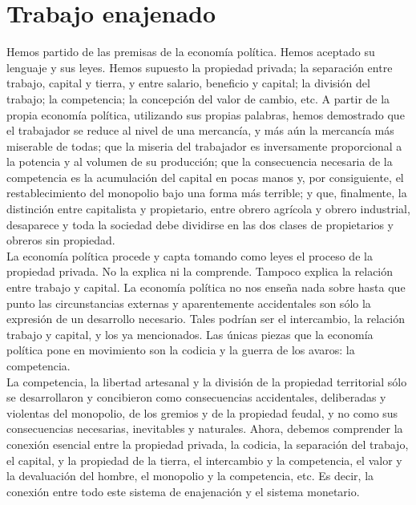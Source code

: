 \section{Trabajo enajenado}
Hemos partido de las premisas de la economía política. Hemos aceptado su lenguaje y sus leyes. Hemos supuesto la propiedad privada; la separación entre trabajo, capital y tierra, y entre salario, beneficio y capital; la división del trabajo; la competencia; la concepción del valor de cambio, etc. A partir de la propia economía política, utilizando sus propias palabras, hemos demostrado que el trabajador se reduce al nivel de una mercancía, y más aún la mercancía más miserable de todas; que la miseria del trabajador es inversamente proporcional a la potencia y al volumen de su producción; que la consecuencia necesaria de la competencia es la acumulación del capital en pocas manos y, por consiguiente, el restablecimiento del monopolio bajo una forma más terrible; y que, finalmente, la distinción entre capitalista y propietario, entre obrero agrícola y obrero industrial, desaparece y toda la sociedad debe dividirse en las dos clases de propietarios y obreros sin propiedad.\\

La economía política procede y capta tomando como leyes el proceso de la propiedad privada. No la explica ni la comprende. Tampoco explica la relación entre trabajo y capital. La economía política no nos enseña nada sobre hasta que punto las circunstancias externas y aparentemente accidentales son sólo la expresión de un desarrollo necesario. Tales podrían ser el intercambio, la relación trabajo y capital, y los ya mencionados. Las únicas piezas que la economía política pone en movimiento son la codicia y la guerra de los avaros: la competencia.\\

La competencia, la libertad artesanal y la división de la propiedad territorial sólo se desarrollaron y concibieron como consecuencias accidentales, deliberadas y violentas del monopolio, de los gremios y de la propiedad feudal, y no como sus consecuencias necesarias, inevitables y naturales. Ahora, debemos comprender la conexión esencial entre la propiedad privada, la codicia, la separación del trabajo, el capital, y la propiedad de la tierra, el intercambio y la competencia, el valor y la devaluación del hombre, el monopolio y la competencia, etc. Es decir, la conexión entre todo este sistema de enajenación y el sistema monetario.\\

